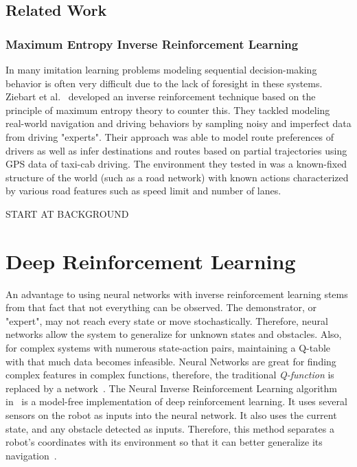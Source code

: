 \documentclass[12pt,american]{report}
\begin{document}
\section{Related Work}
\subsection{Maximum Entropy Inverse Reinforcement Learning}
In many imitation learning problems modeling sequential decision-making behavior is often very difficult due to the lack of foresight in these systems. Ziebart et al.~\cite{ziebart2008maximum} developed an inverse reinforcement technique based on the principle of maximum entropy theory to counter this.  They tackled modeling real-world navigation and driving behaviors by sampling noisy and imperfect data from driving "experts".  Their approach was able to model route preferences of drivers as well as infer destinations and routes based on partial trajectories using GPS data of taxi-cab driving.  The environment they tested in was a known-fixed structure of the world (such as a road network) with known actions characterized by various road features such as speed limit and number of lanes.

START AT BACKGROUND

\chapter{Deep Reinforcement Learning}
An advantage to using neural networks with inverse reinforcement learning stems from that fact that not everything can be observed. The demonstrator, or "expert", may not reach every state or move stochastically. Therefore, neural networks allow the system to generalize for unknown states and obstacles. Also, for complex systems with numerous state-action pairs, maintaining a Q-table with that much data becomes infeasible. Neural Networks are great for finding complex features in complex functions, therefore, the traditional \textit{Q-function} is replaced by a network~\cite{matiisen_2015}. The Neural Inverse Reinforcement Learning algorithm in~\cite{xia2016neural} is a model-free implementation of deep reinforcement learning. It uses several sensors on the robot as inputs into the neural network.  It also uses the current state, and any obstacle detected as inputs. Therefore, this method separates a robot's coordinates with its environment so that it can better generalize its navigation~\cite{xia2016neural}.
	
\end{document}
